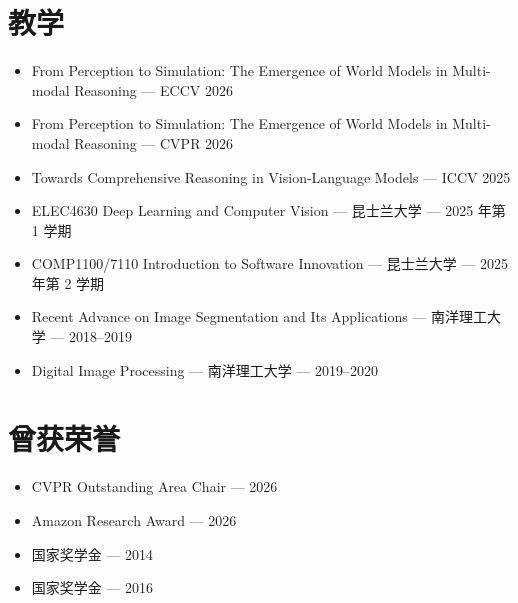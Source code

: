 \section*{教学}
\begin{itemize}
\item From Perception to Simulation: The Emergence of World Models in Multi-modal Reasoning — ECCV 2026
\item From Perception to Simulation: The Emergence of World Models in Multi-modal Reasoning — CVPR 2026
\item Towards Comprehensive Reasoning in Vision-Language Models — ICCV 2025
\item ELEC4630 Deep Learning and Computer Vision — 昆士兰大学 — 2025 年第 1 学期
\item COMP1100/7110 Introduction to Software Innovation — 昆士兰大学 — 2025 年第 2 学期
\item Recent Advance on Image Segmentation and Its Applications — 南洋理工大学 — 2018–2019
\item Digital Image Processing — 南洋理工大学 — 2019–2020
\end{itemize}
\section*{曾获荣誉}
\begin{itemize}
\item CVPR Outstanding Area Chair — 2026
\item Amazon Research Award — 2026
\item 国家奖学金 — 2014
\item 国家奖学金 — 2016
\end{itemize}

